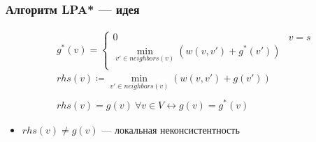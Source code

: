 \documentclass{beamer}
\begin{document}
    \begin{frame}
        \frametitle{Алгоритм LPA* --- идея}

        \begin{align*}
            &g^*(v) = \begin{cases}
                          0 &  v = s\\
                          \displaystyle \min_{v' \in neighbors(v)} (w(v, v') + g^*(v')) \\
            \end{cases} \\
            &rhs(v) \coloneq \min_{v' \in neighbors(v)} (w(v, v') + g(v')) \\ \\
            &rhs(v) = g(v)\ \forall v \in V \leftrightarrow g(v) = g^*(v)
        \end{align*}
        \begin{itemize}
            \item $rhs(v) \neq g(v)$ --- локальная неконсистентность
        \end{itemize}


    \end{frame}
\end{document}
